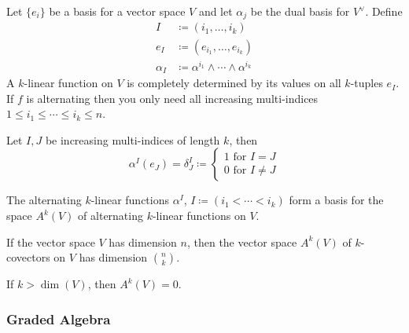 Let \(\{e_i\}\) be a basis for a vector space \(V\) and let \(\alpha_j\) be the dual basis for \(V^\vee\).
%
Define 
%
\begin{equation}
\begin{split}
    I &\coloneqq (i_1, \dots, i_k)  \\
    e_I &\coloneqq (e_{i_1}, \dots, e_{i_k})  \\
    \alpha_I &\coloneqq \alpha^{i_1} \wedge \cdots \wedge \alpha^{i_k}
\end{split}
\end{equation}
%
A \(k\)-linear function on \(V\) is completely determined by its values on all \(k\)-tuples \(e_I\).
%
If \(f\) is alternating then you only need all increasing multi-indices \(1 \leq i_1 \leq \cdots \leq i_k \leq n\).
%
\begin{lemma}{}{}
   Let \(I, J\) be increasing multi-indices of length \(k\), then 
   \begin{equation}
        \alpha^I(e_J) = \delta_J^I \coloneqq \begin{cases}
            1 \text{ for } I = J \\ 
            0 \text{ for } I \neq J
        \end{cases}
   \end{equation}
\end{lemma}
%
\begin{proposition}{}{}
    The alternating \(k\)-linear functions \(\alpha^I\), \(I \coloneqq (i_1 < \cdots < i_k)\) form a basis for the space \(A^k(V)\) of alternating \(k\)-linear functions on \(V\).
\end{proposition}
%
\begin{corollary}{}{}
     If the vector space \(V\) has dimension \(n\), then the vector space \(A^k(V)\) of \(k\)-covectors on \(V\) has dimension \(n \choose k\).
\end{corollary}
%
\begin{corollary}{}{}
     If \(k > \dim(V)\), then \(A^k(V) = 0\).
\end{corollary}


\subsubsection{Graded Algebra}
\newcommand{\gradedA}{A = \bigoplus_k A^k}

